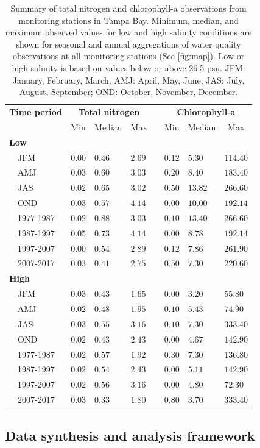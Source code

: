 \documentclass[]{article}
\begin{document}
\begin{table}[!tbp]
\caption{Summary of total nitrogen and chlorophyll-a observations from monitoring stations in Tampa Bay.  Minimum, median, and maximum observed values for low and high salinity conditions are shown for seasonal and annual aggregations of water quality observations at all monitoring stations (See \cref{fig:map}).  Low or high salinity is based on values below or above 26.5 psu. JFM: January, February, March; AMJ: April, May, June; JAS: July, August, September; OND: October, November, December.\label{tab:statsum}} 
\begin{center}
\begin{tabular}{llllclll}
\hline\hline
\multicolumn{1}{l}{\bfseries Time period}&\multicolumn{3}{c}{\bfseries Total nitrogen}&\multicolumn{1}{c}{\bfseries }&\multicolumn{3}{c}{\bfseries Chlorophyll-a}\tabularnewline
\cline{2-4} \cline{6-8}
\multicolumn{1}{l}{}&\multicolumn{1}{c}{Min}&\multicolumn{1}{c}{Median}&\multicolumn{1}{c}{Max}&\multicolumn{1}{c}{}&\multicolumn{1}{c}{Min}&\multicolumn{1}{c}{Median}&\multicolumn{1}{c}{Max}\tabularnewline
\hline
{\bfseries Low}&&&&&&&\tabularnewline
~~JFM&$0.00$&$0.46$&$2.69$&&$0.12$&$ 5.30$&$114.40$\tabularnewline
~~AMJ&$0.03$&$0.60$&$3.03$&&$0.20$&$ 8.40$&$183.40$\tabularnewline
~~JAS&$0.02$&$0.65$&$3.02$&&$0.50$&$13.82$&$266.60$\tabularnewline
~~OND&$0.03$&$0.57$&$4.14$&&$0.00$&$10.00$&$192.14$\tabularnewline
~~1977-1987&$0.02$&$0.88$&$3.03$&&$0.10$&$13.40$&$266.60$\tabularnewline
~~1987-1997&$0.05$&$0.73$&$4.14$&&$0.00$&$ 8.78$&$192.14$\tabularnewline
~~1997-2007&$0.00$&$0.54$&$2.89$&&$0.12$&$ 7.86$&$261.90$\tabularnewline
~~2007-2017&$0.03$&$0.41$&$2.75$&&$0.50$&$ 7.30$&$220.60$\tabularnewline
\hline
{\bfseries High}&&&&&&&\tabularnewline
~~JFM&$0.03$&$0.43$&$1.65$&&$0.00$&$ 3.20$&$ 55.80$\tabularnewline
~~AMJ&$0.02$&$0.48$&$1.95$&&$0.10$&$ 5.43$&$ 74.90$\tabularnewline
~~JAS&$0.03$&$0.55$&$3.16$&&$0.10$&$ 7.30$&$333.40$\tabularnewline
~~OND&$0.02$&$0.43$&$2.43$&&$0.00$&$ 4.67$&$142.90$\tabularnewline
~~1977-1987&$0.02$&$0.57$&$1.92$&&$0.30$&$ 7.30$&$136.80$\tabularnewline
~~1987-1997&$0.02$&$0.54$&$2.43$&&$0.00$&$ 5.11$&$142.90$\tabularnewline
~~1997-2007&$0.02$&$0.56$&$3.16$&&$0.00$&$ 4.80$&$ 72.30$\tabularnewline
~~2007-2017&$0.03$&$0.33$&$1.80$&&$0.80$&$ 3.70$&$333.40$\tabularnewline
\hline
\end{tabular}\end{center}
\end{table}

\subsection{Data synthesis and analysis
framework}\label{data-synthesis-and-analysis-framework}
\end{document}
